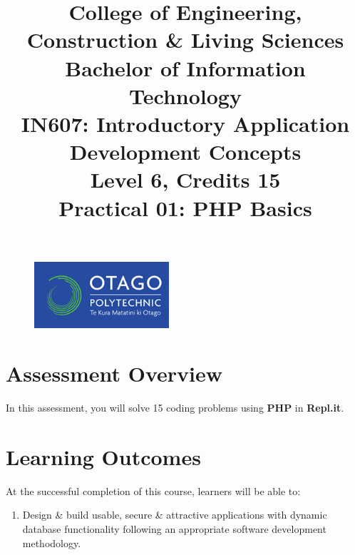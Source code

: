 \documentclass{article}
\author{}
\begin{document}
\begin{figure}
    \centering
    \includegraphics[width=50mm]{./img/logo.png}
\end{figure}

\title{College of Engineering, Construction \& Living Sciences\\Bachelor of Information Technology\\IN607: Introductory Application Development Concepts\\Level 6, Credits 15\\\textbf{Practical 01: PHP Basics}}
\date{}
\maketitle

\section*{Assessment Overview}
In this assessment, you will solve 15 coding problems using \textbf{PHP} in \textbf{Repl.it}. 

\section*{Learning Outcomes}
At the successful completion of this course, learners will be able to: 
\begin{enumerate}
	\item Design \& build usable, secure \& attractive applications with dynamic database functionality following an appropriate software development methodology.
\end{enumerate} 
\end{document}
